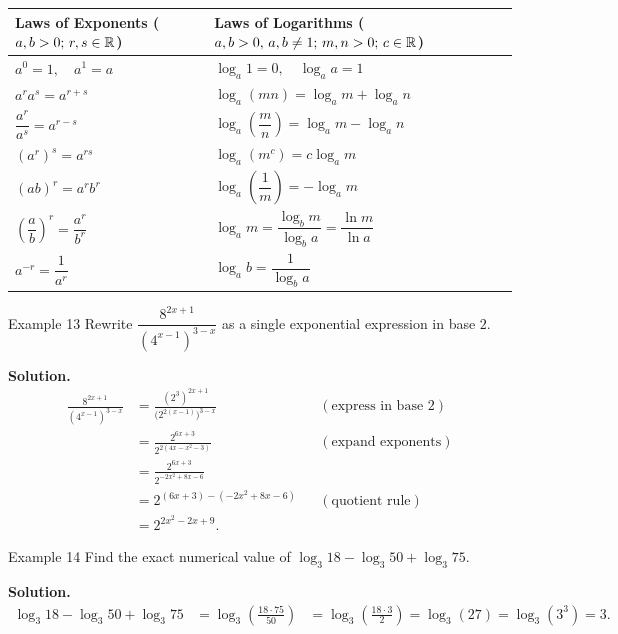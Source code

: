 \begin{center}
\begin{tabular}{l|l}
\toprule
\textbf{Laws of Exponents} (\(a, b > 0;\, r, s \in \mathbb{R}\)) & \textbf{Laws of Logarithms} (\(a, b > 0,\, a, b \neq 1;\, m, n > 0;\, c \in \mathbb{R}\)) \\
\midrule
\(a^0 = 1, \quad a^1 = a\) & \(\log_a 1 = 0, \quad \log_a a = 1\) \\
\(a^r a^s = a^{r+s}\) & \(\log_a(mn) = \log_a m + \log_a n\) \\
\(\dfrac{a^r}{a^s} = a^{r-s}\) & \(\log_a\!\left(\dfrac{m}{n}\right) = \log_a m - \log_a n\) \\
\((a^r)^s = a^{rs}\) & \(\log_a(m^c) = c \log_a m\) \\
\((ab)^r = a^r b^r\) & \(\log_a\!\left(\dfrac{1}{m}\right) = -\log_a m\) \\
\(\left(\dfrac{a}{b}\right)^{\!r} = \dfrac{a^r}{b^r}\) & \(\log_a m = \dfrac{\log_b m}{\log_b a} = \dfrac{\ln m}{\ln a}\) \\
\(a^{-r} = \dfrac{1}{a^r}\) & \(\log_a b = \dfrac{1}{\log_b a}\) \\
\bottomrule
\end{tabular}
\end{center}

\begin{examplebox}{Example 13}
Rewrite \(\dfrac{8^{2x+1}}{(4^{x-1})^{3-x}}\) as a single exponential expression in base \(2\).

\medskip
\textbf{Solution.}
\begin{align*}
\frac{8^{2x+1}}{(4^{x-1})^{3-x}} &= \frac{(2^3)^{2x+1}}{\bigl(2^{2(x-1)}\bigr)^{3-x}} && (\text{express in base } 2) \\[4pt]
&= \frac{2^{6x+3}}{2^{2(4x - x^2 - 3)}} && (\text{expand exponents}) \\[4pt]
&= \frac{2^{6x+3}}{2^{-2x^2 + 8x - 6}} \\[4pt]
&= 2^{(6x+3) - (-2x^2 + 8x - 6)} && (\text{quotient rule}) \\[4pt]
&= 2^{2x^2 - 2x + 9}.
\end{align*}
\end{examplebox}

\begin{examplebox}{Example 14}
Find the exact numerical value of \(\log_3 18 - \log_3 50 + \log_3 75\).

\medskip
\textbf{Solution.}
\begin{align*}
\log_3 18 - \log_3 50 + \log_3 75 &= \log_3\!\left(\frac{18 \cdot 75}{50}\right) 
&= \log_3\!\left(\frac{18 \cdot 3}{2}\right) = \log_3(27) = \log_3(3^3) = 3.
\end{align*}
\end{examplebox}

